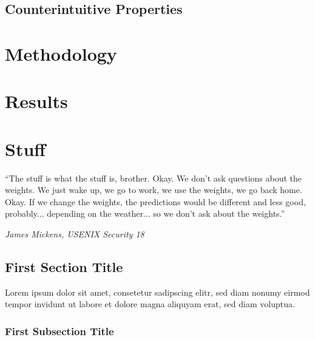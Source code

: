 \documentclass[a4paper, oneside]{discothesis}
\begin{document}
\section{Counterintuitive Properties}



\chapter{Methodology}

\chapter{Results}

\chapter{Stuff}


\newpage

\begin{flushright}
	``The stuff is what the stuff is, brother. Okay. We don't ask questions about the weights. We just wake up, we go to work, we use the weights, we go back home. Okay. If we change the weights, the predictions would be different and less good, probably... depending on the weather... so we don't ask about the weights.''
	
	\textit{\textemdash{} James Mickens, USENIX Security 18~\cite{218395}}
\end{flushright}

\bigskip

\section{First Section Title}

Lorem ipsum dolor sit amet, consetetur sadipscing elitr, sed diam nonumy eirmod tempor invidunt ut labore et dolore magna aliquyam erat, sed diam voluptua.

\subsection{First Subsection Title}
\end{document}
